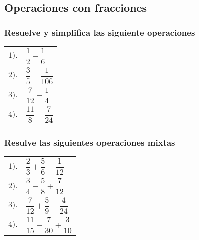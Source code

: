 \subsection{Operaciones con fracciones}

\begin{frame}
\frametitle{Resuelve y simplifica las siguiente operaciones}
\begin{table}
\renewcommand{\arraystretch}{2}
\begin{tabular}{l l}
$1).$ & $\dfrac{1}{2} - \dfrac{1}{6}$ \\
$2).$ & $\dfrac{3}{5} - \dfrac{1}{106}$ \\
$3).$ & $\dfrac{7}{12} - \dfrac{1}{4}$ \\
$4).$ & $\dfrac{11}{8} - \dfrac{7}{24}$ \\
\end{tabular}
\end{table}
\end{frame}
\begin{frame}
\frametitle{Resulve las siguientes operaciones mixtas}
\begin{table}
\renewcommand{\arraystretch}{2}
\begin{tabular}{l l}
$1).$ & $\dfrac{2}{3} + \dfrac{5}{6} - \dfrac{1}{12} $ \\
$2).$ & $\dfrac{3}{4} - \dfrac{5}{8} + \dfrac{7}{12}$ \\
$3).$ & $\dfrac{7}{12} + \dfrac{5}{9} - \dfrac{4}{24}$ \\
$4).$ & $\dfrac{11}{15} - \dfrac{7}{30} + \dfrac{3}{10}$ \\
\end{tabular}
\end{table}
  
\end{frame}
